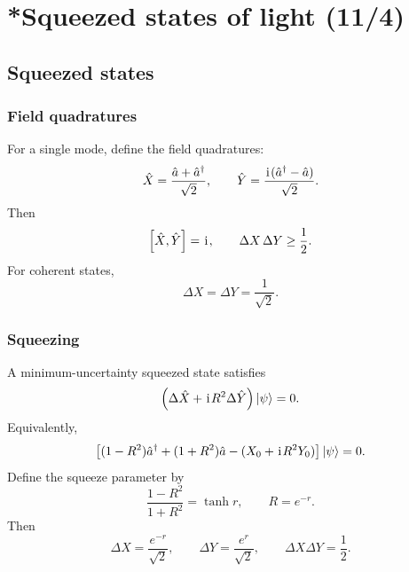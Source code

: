\section{*Squeezed states of light (11/4)}


\subsection{Squeezed states}

\subsubsection{Field quadratures}
For a single mode, define the field quadratures:
\begin{equation}
\hat X=\frac{\hat a+\hat a^\dagger}{\sqrt2},
\qquad
\hat Y=\frac{\hspace{1pt}\mathrm{i}\hspace{1pt}(\hat a^\dagger-\hat a)}{\sqrt2}.
\end{equation}
Then
\begin{equation}
\left[\hat X,\hat Y\right]=\hspace{1pt}\mathrm{i}\hspace{1pt},
\qquad
\Delta X\,\Delta Y\geq\frac12.
\end{equation}
For coherent states,
\begin{equation}
\Delta X=\Delta Y=\frac{1}{\sqrt2}.
\end{equation}

\subsubsection{Squeezing}
A minimum-uncertainty squeezed state satisfies
\begin{equation}
\left(\Delta\hat X+\hspace{1pt}\mathrm{i}\hspace{1pt} R^2\Delta\hat Y\right)|{\psi}\rangle=0.
\end{equation}
Equivalently,
\begin{equation}
\left[(1-R^2)\hat a^\dagger+(1+R^2)\hat a
-(X_0+\hspace{1pt}\mathrm{i}\hspace{1pt} R^2Y_0)\right]|{\psi}\rangle=0.
\end{equation}
Define the squeeze parameter by
\begin{equation}
\frac{1-R^2}{1+R^2}=\tanh r,
\qquad
R=e^{-r}.
\end{equation}
Then
\begin{equation}
\boxed{\Delta X=\frac{e^{-r}}{\sqrt2},
\qquad
\Delta Y=\frac{e^r}{\sqrt2},
\qquad
\Delta X\Delta Y=\frac12.}
\end{equation}


